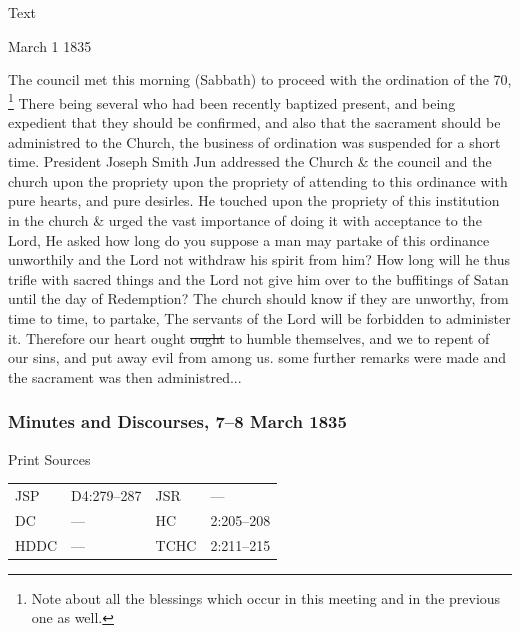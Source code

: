 			\begin{description}
				\item[Text]
			\end{description}
			
				\begin{tightright}
				March 1 1835
				\end{tightright}
			
				The council met this morning (Sabbath) to proceed with the ordination of the 70,%
					\footnote{%
						\label{EMS-1835-JS-1-MAR-1835-NOTE-seventy}%
						Note about all the blessings which occur in this meeting and in the previous one as well.
						}
				There being several who had been recently baptized present, and being expedient that they should be confirmed, and also that the sacrament should be administred to the Church, the business of ordination was suspended for a short time. President Joseph Smith Jun addressed the Church \& the council and the church upon the propriety upon the propriety of attending to this ordinance with pure hearts, and pure desirles. He touched upon the propriety of this institution in the church \& urged the vast importance of doing it with acceptance to the Lord, He asked how long do you suppose a man may partake of this ordinance unworthily and the Lord not withdraw his spirit from him? How long will he thus trifle with sacred things and the Lord not give him over to the buffitings of Satan until the day of Redemption? The church should know if they are unworthy, from time to time, to partake, The servants of the Lord will be forbidden to administer it. Therefore our heart ought \sout{ought} to humble themselves, and we to repent of our sins, and put away evil from among us. some further remarks were made and the sacrament was then administred...
				
		\subsubsection{Minutes and Discourses, 7--8 March 1835}
			\label{EMS-1835-JS-7-8-MAR-1835}
			
			\begin{description}
				\item[Print Sources]
			\end{description}

				\begin{tabular}{p{0.5in}p{1in}p{0.5in}p{1in}}
				JSP	 	& D4:279--287		& JSR 		& --- \\
				DC	 	& --- 				& HC 		& 2:205--208 \\
				HDDC 	& ---				& TCHC 		& 2:211--215 \\
				\end{tabular}
			
